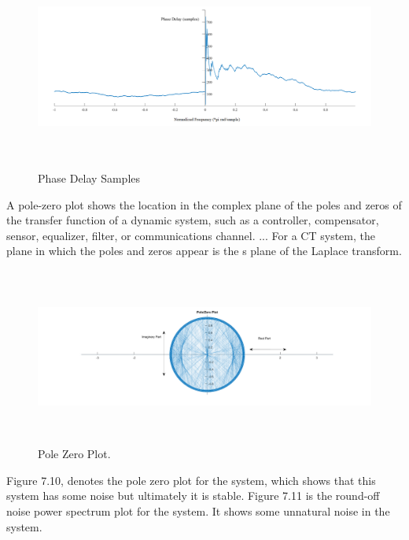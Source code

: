 \begin{enumerate}[label=\roman*]

\begin{figure}[H]
	\begin{Center}
		\includegraphics[width=6.5in,height=2.67in]{23}
		\caption{Phase Delay Samples}
		\label{fig:_9_Phase_Delay_Samples}
	\end{Center}
\end{figure}



\par

\par


\vspace{\baselineskip}
\begin{justify}
A pole-zero plot shows the location in the complex plane of the poles and zeros of the transfer function of a dynamic system, such as a controller, compensator, sensor, equalizer, filter, or communications channel. ... For a CT system, the plane in which the poles and zeros appear is the s plane of the Laplace transform.
\end{justify}\par




\begin{figure}[H]
	\begin{Center}
		\includegraphics[width=6.55in,height=2.29in]{24}
	\end{Center}
\caption{Pole Zero Plot.}
\end{figure}
Figure 7.10, denotes the pole zero plot for the system, which shows that this system has some noise but ultimately it is stable. Figure 7.11 is the round-off noise power spectrum plot for the system. It shows some unnatural noise in the system.


\end{enumerate}
